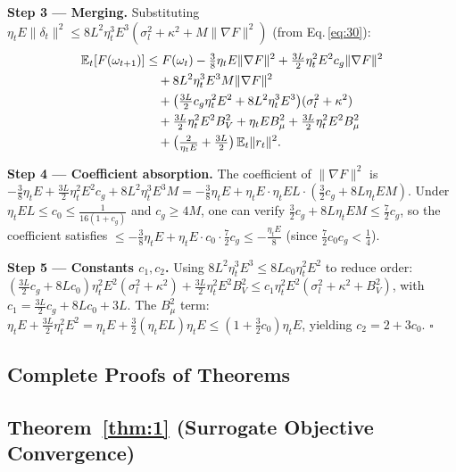 \noindent\textbf{Step 3 --- Merging.}
Substituting \(\eta_t E\|\delta_t\|^2 \le 8L^2\eta_t^3 E^3(\sigma_l^2 + \kappa^2 + M\|\nabla F\|^2)\) (from Eq.\,\eqref{eq:30}):
\begin{align*}
  \mathbb E_t[F(\omega_{t+1})]
  &\le F(\omega_t)
     - \tfrac{3}{8}\eta_t E\|\nabla F\|^2
     + \tfrac{3L}{2}\eta_t^2 E^2 c_g\|\nabla F\|^2 \notag\\
  &\quad + 8L^2\eta_t^3 E^3 M\|\nabla F\|^2 \notag\\
  &\quad + \bigl(\tfrac{3L}{2}c_g\eta_t^2 E^2 + 8L^2\eta_t^3 E^3\bigr)(\sigma_l^2 + \kappa^2) \\
  &\quad + \tfrac{3L}{2}\eta_t^2 E^2 B_V^2
     + \eta_t E B_\mu^2
     + \tfrac{3L}{2}\eta_t^2 E^2 B_\mu^2 \notag\\
  &\quad + \bigl(\tfrac{2}{\eta_t E} + \tfrac{3L}{2}\bigr)\,\mathbb E_t\|r_t\|^2.
\end{align*}

\noindent\textbf{Step 4 --- Coefficient absorption.}
The coefficient of \(\|\nabla F\|^2\) is
\(-\frac{3}{8}\eta_t E + \frac{3L}{2}\eta_t^2 E^2 c_g + 8L^2\eta_t^3 E^3 M
 = -\frac{3}{8}\eta_t E + \eta_t E \cdot \eta_t E L \cdot (\frac{3}{2}c_g + 8L\eta_t E M)\).
Under \(\eta_t E L \le c_0 \le \frac{1}{16(1+c_g)}\) and \(c_g \ge 4M\),
one can verify \(\frac{3}{2}c_g + 8L\eta_t E M \le \frac{7}{2}c_g\),
so the coefficient satisfies
\(\le -\frac{3}{8}\eta_t E + \eta_t E \cdot c_0 \cdot \frac{7}{2}c_g
   \le -\frac{\eta_t E}{8}\)
(since \(\frac{7}{2}c_0 c_g < \frac{1}{4}\)).

\noindent\textbf{Step 5 --- Constants \(c_1, c_2\).}
Using \(8L^2\eta_t^3 E^3 \le 8L c_0 \eta_t^2 E^2\) to reduce order:
\((\frac{3L}{2}c_g + 8L c_0)\eta_t^2 E^2(\sigma_l^2 + \kappa^2)
   + \frac{3L}{2}\eta_t^2 E^2 B_V^2
 \le c_1\eta_t^2 E^2(\sigma_l^2 + \kappa^2 + B_V^2)\),
with \(c_1 = \frac{3L}{2}c_g + 8L c_0 + 3L\).
The \(B_\mu^2\) term:
\(\eta_t E + \frac{3L}{2}\eta_t^2 E^2
 = \eta_t E + \frac{3}{2}(\eta_t E L)\eta_t E
 \le (1 + \frac{3}{2}c_0)\eta_t E\),
yielding \(c_2 = 2 + 3c_0\). \(\square\)

\subsection{Complete Proofs of Theorems}

\subsection*{Theorem~\ref{thm:1} (Surrogate Objective Convergence)}


